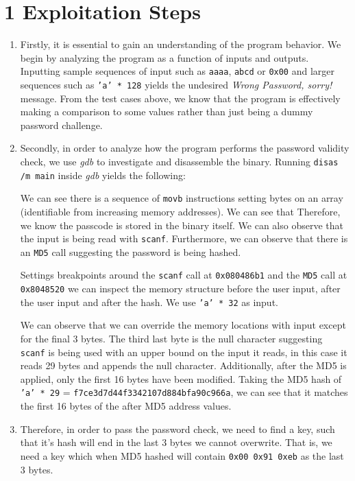 \documentclass[a4paper, 12pt]{article}
\begin{document}
\section*{1 Exploitation Steps}
\begin{enumerate}
	\item Firstly, it is essential to gain an understanding of the program behavior. We begin by analyzing the program as a function of inputs and outputs. Inputting sample sequences of input such as \texttt{aaaa}, \texttt{abcd} or \texttt{0x00} and larger sequences such as \texttt{'a' * 128} yields the undesired \textit{Wrong Password, sorry!} message. From the test cases above, we know that the program is effectively making a comparison to some values rather than just being a dummy password challenge.
    \item Secondly, in order to analyze how the program performs the password validity check, we use \textit{gdb} to investigate and disassemble the binary. Running \texttt{disas /m main} inside \textit{gdb} yields the following: 
    
    
    We can see there is a sequence of \texttt{movb} instructions setting bytes on an array (identifiable from increasing memory addresses). We can see that  Therefore, we know the passcode is stored in the binary itself. We can also observe that the input is being read with \texttt{scanf}. Furthermore, we can observe that there is an \texttt{MD5} call suggesting the password is being hashed.
    
    Settings breakpoints around the \texttt{scanf} call at \texttt{0x080486b1} and the \texttt{MD5} call at \texttt{0x8048520} we can inspect the memory structure before the user input, after the user input and after the hash. We use \texttt{'a' * 32} as input.
        
        
	We can observe that we can override the memory locations with input except for the final 3 bytes. The third last byte is the null character suggesting \texttt{scanf} is being used with an upper bound on the input it reads, in this case it reads 29 bytes and appends the null character.
	Additionally, after the MD5 is applied, only the first 16 bytes have been modified. Taking the MD5 hash of \texttt{'a' * 29} = \texttt{f7ce3d7d44f3342107d884bfa90c966a}, we can see that it matches the first 16 bytes of the after MD5 address values.
    
    \item Therefore, in order to pass the password check, we need to find a key, such that it's hash will end in the last 3 bytes we cannot overwrite. That is, we need a key which when MD5 hashed will contain \texttt{0x00 0x91 0xeb} as the last 3 bytes.
    

\end{enumerate}
\end{document}
